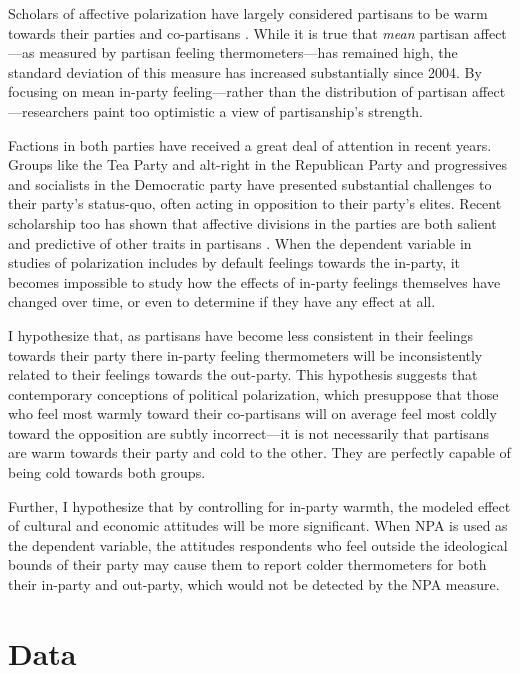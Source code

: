 \documentclass[12pt]{paper}
\begin{document}
Scholars of affective polarization have largely considered partisans to be warm towards their parties and co-partisans \citep{iyengar2012affect, iyengar2018strengthening, abramowitz2010disappearing}. While it is true that \textit{mean} partisan affect---as measured by partisan feeling thermometers---has remained high, the standard deviation of this measure has increased substantially since 2004. By focusing on mean in-party feeling---rather than the distribution of partisan affect---researchers paint too optimistic a view of partisanship's strength. 

Factions in both parties have received a great deal of attention in recent years. Groups like the Tea Party and alt-right in the Republican Party and progressives and socialists in the Democratic party have presented substantial challenges to their party's status-quo, often acting in opposition to their party's elites. Recent scholarship too has shown that affective divisions in the parties are both salient and predictive of other traits in partisans \citep{wronski2018tale, bankert2020authoritarian}. When the dependent variable in studies of polarization includes by default feelings towards the in-party, it becomes impossible to study how the effects of in-party feelings themselves have changed over time, or even to determine if they have any effect at all.


I hypothesize that, as partisans have become less consistent in their feelings towards their party there in-party feeling thermometers will be inconsistently related to their feelings towards the out-party. This hypothesis suggests that contemporary conceptions of political polarization, which presuppose that those who feel most warmly toward their co-partisans will  on average feel most coldly toward the opposition are subtly incorrect---it is not necessarily that partisans are warm towards their party and cold to the other. They are perfectly capable of being cold towards both groups. 

Further, I hypothesize that by controlling for in-party warmth, the modeled effect of cultural and economic attitudes will be more significant. When NPA is used as the dependent variable, the attitudes respondents who feel outside the ideological bounds of their party may cause them to report colder thermometers for both their in-party and out-party, which would not be detected by the NPA measure.

\section{Data}
\end{document}
